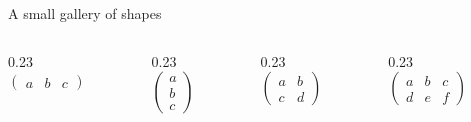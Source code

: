 \begin{frame}{A small gallery of shapes}
  \begin{columns}[T,onlytextwidth]
    \begin{column}{0.23\textwidth}
      \centering{}\\[0.3cm]
      $\begin{pmatrix}a&b&c\end{pmatrix}$\\[0.2cm]
    \end{column}
    \begin{column}{0.23\textwidth}
      \centering{}\\[0.3cm]
      $\begin{pmatrix}a\\b\\c\end{pmatrix}$\\[0.2cm]
    \end{column}
    \begin{column}{0.23\textwidth}
      \centering{}\\[0.3cm]
      $\begin{pmatrix}a&b\\c&d\end{pmatrix}$\\[0.2cm]
    \end{column}
    \begin{column}{0.23\textwidth}
      \centering{}\\[0.3cm]
      $\begin{pmatrix}a&b&c\\d&e&f\end{pmatrix}$\\[0.2cm]
    \end{column}
  \end{columns}

  \vspace{0.8cm}
\end{frame}

